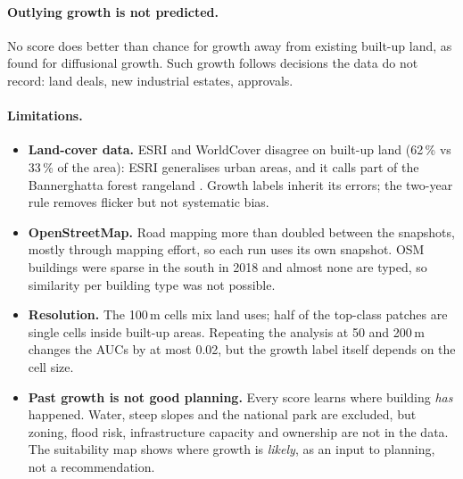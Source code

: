 \paragraph{Outlying growth is not predicted.} No score does better than chance for growth away
from existing built-up land, as \citet{wang2021} found for diffusional growth. Such growth
follows decisions the data do not record: land deals, new industrial estates, approvals.

\paragraph{Limitations.}
\begin{itemize}
  \item \textbf{Land-cover data.} ESRI and WorldCover disagree on built-up land (62\,\% vs
        33\,\% of the area): ESRI generalises urban areas, and it calls part of the
        Bannerghatta forest rangeland \citep{venter2022}. Growth labels inherit its errors; the
        two-year rule removes flicker but not systematic bias.
  \item \textbf{OpenStreetMap.} Road mapping more than doubled between the snapshots, mostly
        through mapping effort, so each run uses its own snapshot. OSM buildings were sparse in
        the south in 2018 \citep{herfort2023} and almost none are typed, so similarity per
        building type was not possible.
  \item \textbf{Resolution.} The 100\,m cells mix land uses; half of the top-class patches are
        single cells inside built-up areas. Repeating the analysis at 50 and 200\,m changes the
        AUCs by at most 0.02, but the growth label itself depends on the cell size.
  \item \textbf{Past growth is not good planning.} Every score learns where building
        \emph{has} happened. Water, steep slopes and the national park are excluded, but
        zoning, flood risk, infrastructure capacity and ownership are not in the data. The
        suitability map shows where growth is \emph{likely}, as an input to planning, not a
        recommendation.
\end{itemize}
